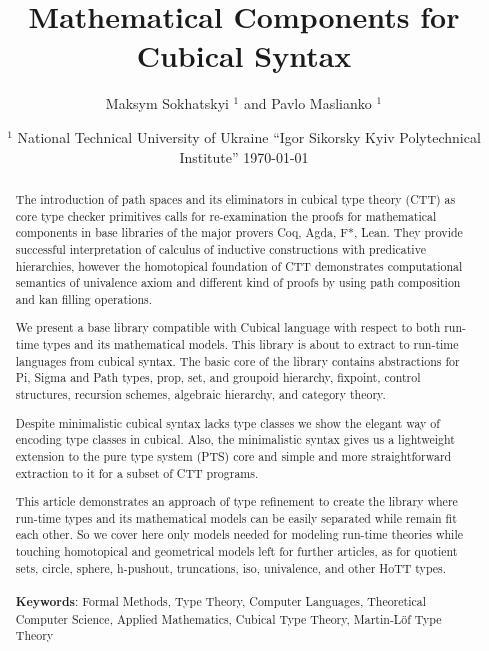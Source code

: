 \documentclass{article}
\begin{document}
\title{Mathematical Components for Cubical Syntax}
\author{Maksym Sokhatskyi $^1$ and Pavlo Maslianko $^1$}
\date{
    $^1$ National Technical University of Ukraine ``Igor Sikorsky Kyiv Polytechnical Institute''
    \today
}

\maketitle

\begin{abstract}

The introduction of path spaces and its eliminators in cubical type theory (CTT)
as core type checker primitives calls for re-examination the proofs for mathematical components
in base libraries of the major provers Coq, Agda, F*, Lean.
They provide successful interpretation of calculus of inductive constructions
with predicative hierarchies, however the homotopical foundation of CTT demonstrates
computational semantics of univalence axiom and different kind of proofs by using path
composition and kan filling operations.

We present a base library compatible with Cubical language \cite{Mortberg17}
with respect to both run-time types and its mathematical models.
This library is about to extract to run-time languages from cubical syntax.
The basic core of the library contains abstractions for Pi, Sigma and Path types,
prop, set, and groupoid hierarchy, fixpoint, control structures, recursion schemes,
algebraic hierarchy, and category theory.

Despite minimalistic cubical syntax lacks type classes we show the elegant
way of encoding type classes in cubical. Also, the minimalistic syntax
gives us a lightweight extension to the pure type system (PTS) core
and simple and more straightforward extraction to it for a subset of CTT programs.

This article demonstrates an approach of type refinement to create
the library where run-time types and its mathematical models can be
easily separated while remain fit each other.
So we cover here only models needed for modeling run-time theories
while touching homotopical and geometrical models left for further
articles, as for quotient sets, circle, sphere, h-pushout, truncations,
iso, univalence, and other HoTT types.
\\
\\
{\bf Keywords}: Formal Methods, Type Theory, Computer Languages,
          Theoretical Computer Science, Applied Mathematics,
          Cubical Type Theory, Martin-Löf Type Theory
\end{abstract}
\end{document}
